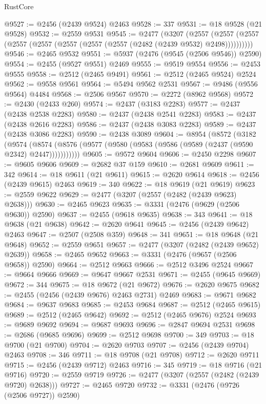 \begin{lexlean}{RustCore}
\begin{coremodule}
@9527 := @2456 (@2439 @9524) @2463
@9528 := 337
@9531 := @18 @9528 (@21 @9528)
@9532 := @2559 @9531
@9545 := @2477
    (@3207
      (@2557 (@2557 (@2557 (@2557 (@2557 (@2557 (@2557 (@2557 (@2482 (@2439 @9532) @2498))))))))))
@9546 := @2465 @9532
@9551 := @5937 (@2476 (@9545 (@2506 @9546)) @2590)
@9554 := @2455 (@9527 @9551) @2469
@9555 := @9519 @9554
@9556 := @2453 @9555
@9558 := @2512 (@2465 @9491)
@9561 := @2512 (@2465 @9524) @2524
@9562 := @9558 @9561
@9564 := @5494 @9562 @2531
@9567 := @9486 (@9556 @9564) @4484
@9568 := @2506 @9567
@9570 := @2272 (@8962 @9568)
@9572 := @2430 (@2433 @260)
@9574 := @2437 (@3183 @2283)
@9577 := @2437 (@2438 @2538 @2283)
@9580 := @2437 (@2438 @2541 @2283)
@9583 := @2437 (@2438 @2616 @2283)
@9586 := @2437 (@2438 @3083 @2283)
@9589 := @2437 (@2438 @3086 @2283)
@9590 := @2438 @3089
@9604 := @8954
    (@8572
      (@3182
        (@9574
          (@8574 (@8576 (@9577 (@9580 (@9583 (@9586 (@9589 (@2437 (@9590 @2342) @2447)))))))))))
@9605 := @9572 @9604
@9606 := @2450 @2298
@9607 := @9605 @9606
@9609 := @2682 @37 @159
@9610 := @2681 @9609
@9611 := 342
@9614 := @18 @9611 (@21 @9611)
@9615 := @2620 @9614
@9618 := @2456 (@2439 @9615) @2463
@9619 := 340
@9622 := @18 @9619 (@21 @9619)
@9623 := @2559 @9622
@9629 := @2477 (@3207 (@2557 (@2482 (@2439 @9623) @2638)))
@9630 := @2465 @9623
@9635 := @3331 (@2476 (@9629 (@2506 @9630)) @2590)
@9637 := @2455 (@9618 @9635)
@9638 := 343
@9641 := @18 @9638 (@21 @9638)
@9642 := @2620 @9641
@9645 := @2456 (@2439 @9642) @2463
@9647 := @2507 (@2508 @359)
@9648 := 341
@9651 := @18 @9648 (@21 @9648)
@9652 := @2559 @9651
@9657 := @2477 (@3207 (@2482 (@2439 @9652) @2639))
@9658 := @2465 @9652
@9663 := @3331 (@2476 (@9657 (@2506 @9658)) @2590)
@9664 := @2512 @9663
@9666 := @2512 @3496 @2524
@9667 := @9664 @9666
@9669 := @9647 @9667 @2531
@9671 := @2455 (@9645 @9669)
@9672 := 344
@9675 := @18 @9672 (@21 @9672)
@9676 := @2620 @9675
@9682 := @2455 (@2456 (@2439 @9676) @2463 @2731) @2469
@9683 := @9671 @9682
@9684 := @9637 @9683
@9685 := @2453 @9684
@9687 := @2512 (@2465 @9615)
@9689 := @2512 (@2465 @9642)
@9692 := @2512 (@2465 @9676) @2524
@9693 := @9689 @9692
@9694 := @9687 @9693
@9696 := @2847 @9694 @2531
@9698 := @2686 (@9685 @9696)
@9699 := @2512 @9698
@9700 := 349
@9703 := @18 @9700 (@21 @9700)
@9704 := @2620 @9703
@9707 := @2456 (@2439 @9704) @2463
@9708 := 346
@9711 := @18 @9708 (@21 @9708)
@9712 := @2620 @9711
@9715 := @2456 (@2439 @9712) @2463
@9716 := 345
@9719 := @18 @9716 (@21 @9716)
@9720 := @2559 @9719
@9726 := @2477 (@3207 (@2557 (@2482 (@2439 @9720) @2638)))
@9727 := @2465 @9720
@9732 := @3331 (@2476 (@9726 (@2506 @9727)) @2590)

\end{coremodule}
\end{lexlean}
